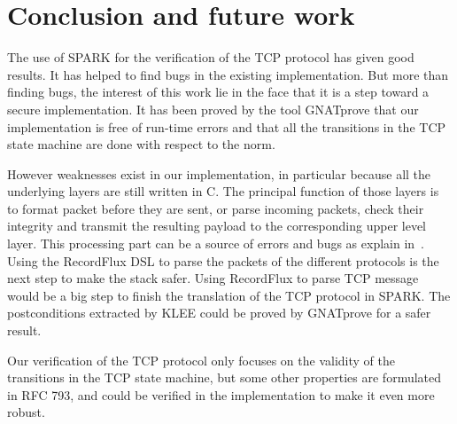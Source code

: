 \documentclass[conference]{IEEEtran}
\begin{document}
\section{Conclusion and future work}

The use of SPARK for the verification of the TCP protocol has given good
results. It has helped to find bugs in the existing implementation. But more
than finding bugs, the interest of this work lie in the face that it is a
step toward a secure implementation. It has been proved by the tool GNATprove
that our implementation is free of run-time errors and that all the transitions
in the TCP state machine are done with respect to the norm.

However weaknesses exist in our implementation, in particular because all the
underlying layers are still written in C. The principal function of those layers
is to format packet before they are sent, or parse incoming packets, check their
integrity and transmit the resulting payload to the corresponding upper level
layer. This processing part can be a source of errors and bugs as explain
in~\cite{Reiher2019RecordFluxFM}.
Using the RecordFlux DSL to parse the packets of the different protocols is the
next step to make the stack safer. Using RecordFlux to parse TCP message
would be a big step to finish the translation of the TCP protocol in SPARK.
The postconditions extracted by KLEE could be proved by GNATprove for a
safer result.

Our verification of the TCP protocol only focuses on the validity of the
transitions in the TCP state machine, but some other properties are formulated
in RFC 793, and could be verified in the implementation to make it even
more robust.





\end{document}
